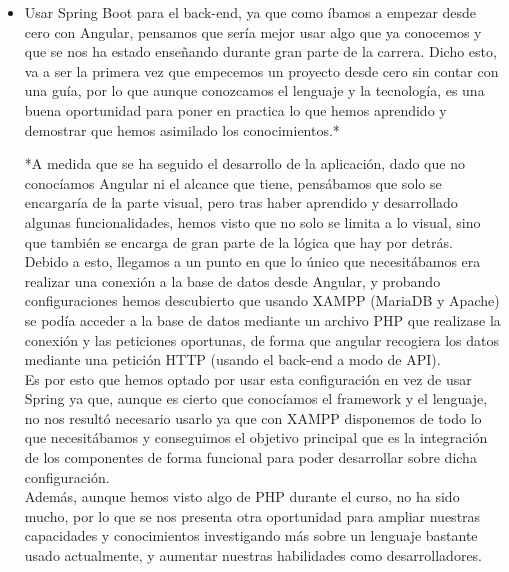 \begin{itemize}
\begin{itemize}
		\item Usar Spring Boot para el back-end, ya que como íbamos a empezar desde cero con Angular, pensamos que sería mejor usar algo que ya conocemos y que se nos ha estado enseñando durante gran parte de la carrera. Dicho esto, va a ser la primera vez que empecemos un proyecto desde cero sin contar con una guía, por lo que aunque conozcamos el lenguaje y la tecnología, es una buena oportunidad para poner en practica lo que hemos aprendido y demostrar que hemos asimilado los conocimientos.*\\
		
		\pagebreak
		
		*A medida que se ha seguido el desarrollo de la aplicación, dado que no conocíamos Angular ni el alcance que tiene, pensábamos que solo se encargaría de la parte visual, pero tras haber aprendido y desarrollado algunas funcionalidades, hemos visto que no solo se limita a lo visual, sino que también se encarga de gran parte de la lógica que hay por detrás.\\
		
		Debido a esto, llegamos a un punto en que lo único que necesitábamos era realizar una conexión a la base de datos desde Angular, y probando configuraciones hemos descubierto que usando XAMPP (MariaDB y Apache) se podía acceder a la base de datos mediante un archivo PHP que realizase la conexión y las peticiones oportunas, de forma que angular recogiera los datos mediante una petición HTTP (usando el back-end a modo de API).\\
		
		Es por esto que hemos optado por usar esta configuración en vez de usar Spring ya que, aunque es cierto que conocíamos el framework y el lenguaje, no nos resultó necesario usarlo ya que con XAMPP disponemos de todo lo que necesitábamos y conseguimos el objetivo principal que es la integración de los componentes de forma funcional para poder desarrollar sobre dicha configuración.\\
		
		Además, aunque hemos visto algo de PHP durante el curso, no ha sido mucho, por lo que se nos presenta otra oportunidad para ampliar nuestras capacidades y conocimientos investigando más sobre un lenguaje bastante usado actualmente, y aumentar nuestras habilidades como desarrolladores.\\
		
	\end{itemize}
\end{itemize}






	